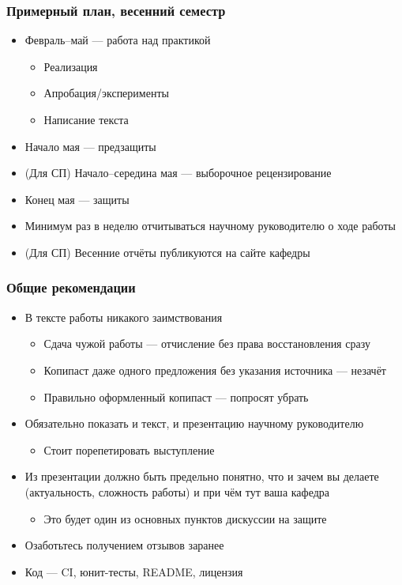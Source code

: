 \documentclass{../../slides-style}
\begin{document}
    \begin{frame}
        \frametitle{Примерный план, весенний семестр}
        \begin{itemize}
            \item Февраль--май --- работа над практикой
            \begin{itemize}
                \item Реализация
                \item Апробация/эксперименты
                \item Написание текста
            \end{itemize}
            \item Начало мая --- предзащиты
            \item (Для СП) Начало--середина мая --- выборочное рецензирование
            \item Конец мая --- защиты
            \item Минимум раз в неделю отчитываться научному руководителю о ходе работы
            \item (Для СП) Весенние отчёты публикуются на сайте кафедры
        \end{itemize}
    \end{frame}

    \begin{frame}
        \frametitle{Общие рекомендации}
        \begin{itemize}
            \item В тексте работы никакого заимствования 
            \begin{itemize}
                \item Сдача чужой работы --- отчисление без права восстановления сразу
                \item Копипаст даже одного предложения без указания источника --- незачёт
                \item Правильно оформленный копипаст --- попросят убрать
            \end{itemize}
            \item Обязательно показать и текст, и презентацию научному руководителю
            \begin{itemize}
                \item Стоит порепетировать выступление
            \end{itemize}
            \item Из презентации должно быть предельно понятно, что и зачем вы делаете (актуальность, сложность работы) и при чём тут ваша кафедра
            \begin{itemize}
                \item Это будет один из основных пунктов дискуссии на защите
            \end{itemize}
            \item Озаботьтесь получением отзывов заранее
            \item Код --- CI, юнит-тесты, README, лицензия
        \end{itemize}
    \end{frame}
\end{document}
